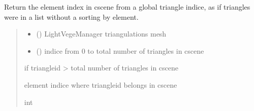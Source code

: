 \documentclass[letterpaper,10pt,english]{sphinxmanual}
\begin{document}

\begin{fulllineitems}
\label{\detokenize{reference:trianglesmesh.globalid_to_elementid}}
\pysigstartsignatures
{}
\pysigstopsignatures
\sphinxAtStartPar
Return the element index in cscene from a global triangle indice,
as if triangles were in a list without a sorting by element.
\begin{quote}\begin{description}
\begin{itemize}
\item {} 
\sphinxAtStartPar
{} () \textendash{} LightVegeManager triangulations mesh

\item {} 
\sphinxAtStartPar
{} () \textendash{} indice from 0 to total number of triangles in cscene

\end{itemize}

\sphinxAtStartPar
{} \textendash{} if triangleid \textgreater{} total number of triangles in cscene

\sphinxAtStartPar
element indice where triangleid belongs in cscene

\sphinxAtStartPar
int

\end{description}\end{quote}

\end{fulllineitems}

\end{document}
